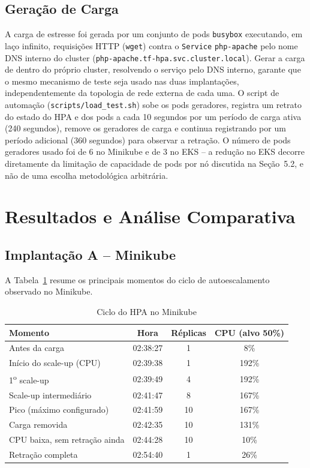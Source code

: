 \documentclass[12pt]{article}
\begin{document}
\subsection{Geração de Carga}

A carga de estresse foi gerada por um conjunto de pods \texttt{busybox}
executando, em laço infinito, requisições HTTP (\texttt{wget}) contra o
\texttt{Service} \texttt{php-apache} pelo nome DNS interno do cluster
(\texttt{php-apache.tf-hpa.svc.cluster.local}). Gerar a carga de dentro do
próprio cluster, resolvendo o serviço pelo DNS interno, garante que o mesmo
mecanismo de teste seja usado nas duas implantações, independentemente da
topologia de rede externa de cada uma. O script de automação
(\texttt{scripts/load\_test.sh}) sobe os pods geradores, registra um
retrato do estado do HPA e dos pods a cada 10 segundos por um período de
carga ativa (240 segundos), remove os geradores de carga e continua
registrando por um período adicional (360 segundos) para observar a
retração. O número de pods geradores usado foi de 6 no Minikube e de 3 no
EKS -- a redução no EKS decorre diretamente da limitação de capacidade de
pods por nó discutida na Seção~5.2, e não de uma escolha metodológica
arbitrária.

\section{Resultados e Análise Comparativa}

\subsection{Implantação A -- Minikube}

A Tabela~\ref{tab:minikube} resume os principais momentos do ciclo de
autoescalamento observado no Minikube.

\begin{table}[ht]
\centering
\caption{Ciclo do HPA no Minikube}
\label{tab:minikube}
\begin{tabular}{lccc}
\toprule
Momento & Hora & Réplicas & CPU (alvo 50\%) \\
\midrule
Antes da carga            & 02:38:27 & 1  & 8\%   \\
Início do scale-up (CPU)  & 02:39:38 & 1  & 192\% \\
1\textsuperscript{o} scale-up          & 02:39:49 & 4  & 192\% \\
Scale-up intermediário    & 02:41:47 & 8  & 167\% \\
Pico (máximo configurado) & 02:41:59 & 10 & 167\% \\
Carga removida            & 02:42:35 & 10 & 131\% \\
CPU baixa, sem retração ainda & 02:44:28 & 10 & 10\% \\
Retração completa         & 02:54:40 & 1  & 26\%  \\
\bottomrule
\end{tabular}
\end{table}
\end{document}
